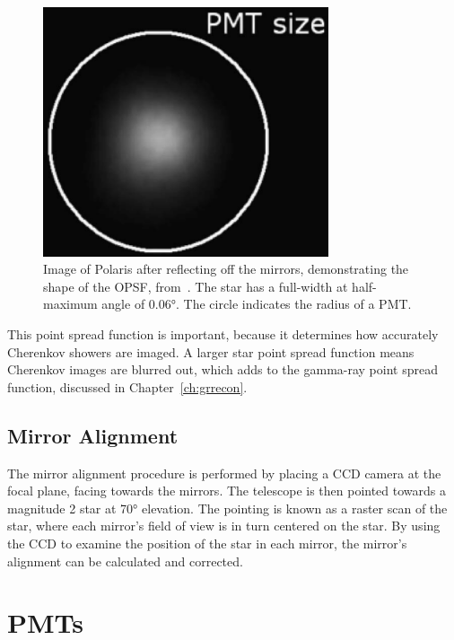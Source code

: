 \begin{figure}[ht]
  \centering
  \includegraphics[width=0.75\textwidth]{images/mirror_polaris.eps}
  \caption[Polaris PSF]{
    Image of Polaris after reflecting off the mirrors, demonstrating the shape of the OPSF, from~\cite{Veritas_Detector}.
    The star has a full-width at half-maximum angle of \ang{0.06}.
    The circle indicates the radius of a PMT.}
  \label{fig:mirrorpolaris}
\end{figure}

This point spread function is important, because it determines how accurately Cherenkov showers are imaged.
A larger star point spread function means Cherenkov images are blurred out, which adds to the gamma-ray point spread function, discussed in Chapter~\ref{ch:grrecon}.


\subsection{Mirror Alignment}
The mirror alignment procedure is performed by placing a CCD camera at the focal plane, facing towards the mirrors.
The telescope is then pointed towards a magnitude 2 star at \nicetilde{}\ang{70} elevation.
The pointing is known as a raster scan of the star, where each mirror's field of view is in turn centered on the star.
By using the CCD to examine the position of the star in each mirror, the mirror's alignment can be calculated and corrected.



\section{PMTs}\label{sec:pmts}

